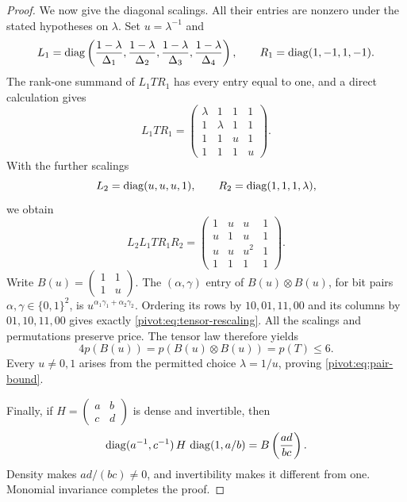\begin{proof}
We now give the diagonal scalings. All their entries are nonzero
under the stated hypotheses on $\lambda$. Set $u=\lambda^{-1}$ and
\[
 L_1=\operatorname{diag}\left(\frac{1-\lambda}{\Delta_1},
 \frac{1-\lambda}{\Delta_2},
 \frac{1-\lambda}{\Delta_3},
 \frac{1-\lambda}{\Delta_4}\right),\qquad
 R_1=\operatorname{diag}(1,-1,1,-1).
\]
The rank-one summand of $L_1TR_1$ has every entry equal to one,
and a direct calculation gives
\[
 L_1TR_1=
 \begin{pmatrix}
 \lambda&1&1&1\\1&\lambda&1&1\\
 1&1&u&1\\1&1&1&u
 \end{pmatrix}.
\]
With the further scalings
\[
 L_2=\operatorname{diag}(u,u,u,1),\qquad R_2=\operatorname{diag}(1,1,1,\lambda),
\]
we obtain
\begin{equation}\label{pivot:eq:tensor-rescaling}
 L_2L_1TR_1R_2=
 \begin{pmatrix}
 1&u&u&1\\u&1&u&1\\u&u&u^2&1\\1&1&1&1
 \end{pmatrix}.
\end{equation}
Write $B(u)=\left(\begin{smallmatrix}1&1\\1&u\end{smallmatrix}\right)$.
The $(\alpha,\gamma)$ entry of $B(u)\otimes B(u)$, for bit pairs
$\alpha,\gamma\in\{0,1\}^2$, is
$u^{\alpha_1\gamma_1+\alpha_2\gamma_2}$.
Ordering its rows by $10,01,11,00$ and its columns by
$01,10,11,00$ gives exactly \cref{pivot:eq:tensor-rescaling}.
All the scalings and permutations preserve price. The tensor law
therefore yields
\[
 4p(B(u))=p(B(u)\otimes B(u))=p(T)\le6.
\]
Every $u\ne0,1$ arises from the permitted choice $\lambda=1/u$,
proving \cref{pivot:eq:pair-bound}.

Finally, if $H=\left(\begin{smallmatrix}a&b\\c&d\end{smallmatrix}\right)$
is dense and invertible, then
\[
 \operatorname{diag}(a^{-1},c^{-1})\,H\,\operatorname{diag}(1,a/b)
 =B\left(\frac{ad}{bc}\right).
\]
Density makes $ad/(bc)\ne0$, and invertibility makes it different
from one. Monomial invariance completes the proof.
\end{proof}
